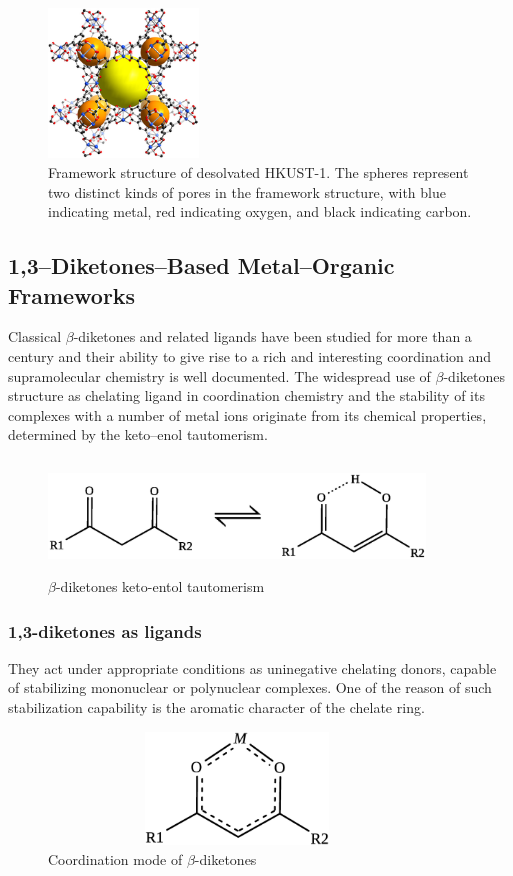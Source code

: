 \documentclass[../Master.tex]{subfiles}
\begin{document}
\begin{figure}[h!]
	\centering
	\includegraphics[width=4cm,keepaspectratio]{Images/hkust1.png}
	\caption{Framework structure of desolvated HKUST-1. The spheres represent two distinct kinds of pores in the framework structure, with blue indicating metal, red indicating oxygen, and black indicating carbon.}
\end{figure}

\subsection{1,3–Diketones–Based Metal–Organic Frameworks}\label{dk-mof}
Classical \(\beta\)-diketones and related ligands have been studied for more than a century and their ability to give rise to a rich and interesting coordination and supramolecular chemistry is well documented\cite{aromi_poly_2008}. The widespread use of \(\beta\)-diketones structure as chelating ligand in coordination chemistry and the stability of its complexes with a number of metal ions originate from its chemical properties, determined by the keto–enol tautomerism.

\begin{figure}[h!]
	\centering
	\includegraphics[width=10cm,height=3cm,keepaspectratio]{Structures/diktau.eps}
	\caption{\(\beta\)-diketones keto-entol tautomerism}\label{fig:diktau}
\end{figure}

\subsubsection{1,3-diketones as ligands}
They act under appropriate conditions as uninegative chelating donors, capable of stabilizing mononuclear or polynuclear complexes. One of the reason of such stabilization capability is the aromatic character of the chelate ring.
\begin{figure}[h]
	\centering
	\includegraphics[width=10cm,height=3cm,keepaspectratio]{Structures/dikcordmode.eps}
	\caption{Coordination mode of $\beta$-diketones}\label{fig:diktaucordmode}
\end{figure}
\end{document}
